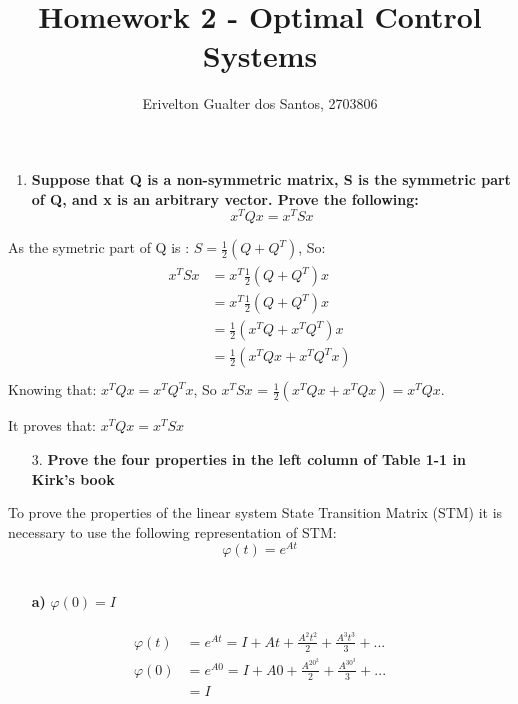 \documentclass{article}
\begin{document}
\title{Homework 2 - Optimal Control Systems}
\author{Erivelton Gualter dos Santos, 2703806}
\date{}

\maketitle 

\begin{enumerate}[]
\item \textbf{Suppose that Q is a non-symmetric matrix, S is the symmetric part of Q, and x is an arbitrary vector. Prove the following:}
$$ x^T Q x = x^T S x $$
\end{enumerate}

As the symetric part of Q is : $ S = \frac{1}{2}(Q+Q^T) $, So:
\begin{eqnarray*}
\begin{split}
	x^T S x &= x^T \frac{1}{2}(Q+Q^T) x \\
	&= x^T \frac{1}{2}(Q+Q^T) x \\
	&= \frac{1}{2}(x^TQ+x^TQ^T) x \\
	&= \frac{1}{2}(x^TQx+x^TQ^Tx) \\
\end{split}
\end{eqnarray*}
Knowing that: $x^TQx=x^TQ^Tx$, So $x^T S x $ = $ \frac{1}{2}(x^TQx+x^TQx)=x^TQx $.

It proves that: $ x^T Q x = x^T S x $

\begin{enumerate}[]
\item[3.] \textbf{Prove the four properties in the left column of Table 1-1 in Kirk's book}
\end{enumerate}

To prove the properties of the linear system State Transition Matrix (STM) it is necessary to use the following representation of STM:
$$ \varphi(t) = e^{At}$$
\
\begin{enumerate}[]
\item[\textbf{a)}] $ \varphi(0) = I $
\end{enumerate}
\begin{eqnarray*}
\begin{split}
	\varphi(t) &= e^{At} = I+At+\frac{A^2t^2}{2\!}+\frac{A^3t^3}{3\!} + ...\\
	\varphi(0) &= e^{A0} = I+A0+\frac{A^20^2}{2\!}+\frac{A^30^3}{3\!} + ...\\
	&= I
\end{split}
\end{eqnarray*}
\end{document}

